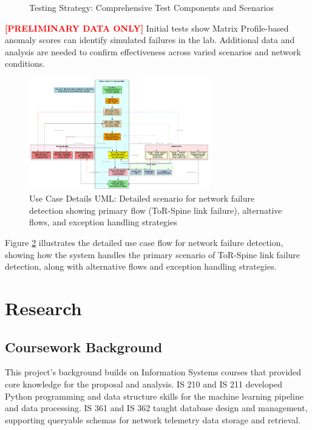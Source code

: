\documentclass[11pt]{article}
\begin{document}
\begin{figure}[h]
\centering

\caption{Testing Strategy: Comprehensive Test Components and Scenarios}
\label{fig:testing}
\end{figure}

\textcolor{red}{\textbf{[PRELIMINARY DATA ONLY]}} Initial tests show Matrix Profile-based anomaly scores can identify simulated failures in the lab. Additional data and analysis are needed to confirm effectiveness across varied scenarios and network conditions.

\begin{figure}[h]
\centering
\includegraphics[width=0.7\textwidth]{usecase_details.png}
\caption{Use Case Details UML: Detailed scenario for network failure detection showing primary flow (ToR-Spine link failure), alternative flows, and exception handling strategies}
\label{fig:usecase}
\end{figure}

Figure \ref{fig:usecase} illustrates the detailed use case flow for network failure detection, showing how the system handles the primary scenario of ToR-Spine link failure detection, along with alternative flows and exception handling strategies.

\section{Research}

\subsection{Coursework Background}

This project's background builds on Information Systems courses that provided core knowledge for the proposal and analysis. IS 210 and IS 211 developed Python programming and data structure skills for the machine learning pipeline and data processing. IS 361 and IS 362 taught database design and management, supporting queryable schemas for network telemetry data storage and retrieval.
\end{document}
